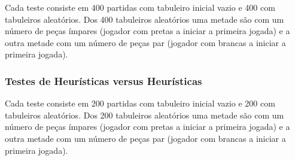 Cada teste consiste em 400 partidas com tabuleiro inicial vazio e 400 com tabuleiros aleatórios. Dos 400 tabuleiros aleatórios uma metade são com um número de peças ímpares (jogador com pretas a iniciar a primeira jogada) e a outra metade com um número de peças par (jogador com brancas a iniciar a primeira jogada). 




\newpage
\subsubsection{Testes de Heurísticas versus Heurísticas}

Cada teste consiste em 200 partidas com tabuleiro inicial vazio e 200 com tabuleiros aleatórios. Dos 200 tabuleiros aleatórios uma metade são com um número de peças ímpares (jogador com pretas a iniciar a primeira jogada) e a outra metade com um número de peças par (jogador com brancas a iniciar a primeira jogada).




